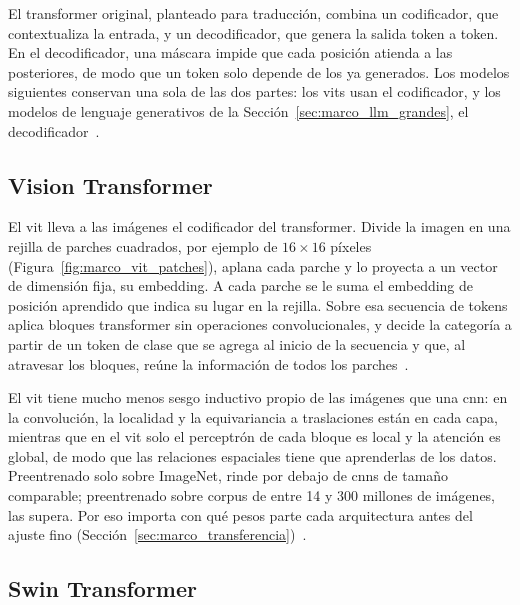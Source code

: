 El transformer original, planteado para traducción, combina un codificador, que contextualiza la entrada, y un
decodificador, que genera la salida token a token. En el decodificador, una máscara impide que cada posición
atienda a las posteriores, de modo que un token solo depende de los ya generados. Los modelos siguientes
conservan una sola de las dos partes: los \glspl{vit} usan el codificador, y los modelos de lenguaje
generativos de la Sección~\ref{sec:marco_llm_grandes}, el
decodificador~\cite{vaswani2017attention,dosovitskiy2021image,brown2020language}.

\subsection{Vision Transformer}
\label{sec:marco_vit}

El \gls{vit} lleva a las imágenes el codificador del transformer. Divide la imagen en una rejilla de parches
cuadrados, por ejemplo de $16 \times 16$ píxeles (Figura~\ref{fig:marco_vit_patches}), aplana cada parche y lo proyecta a un vector de dimensión
fija, su embedding. A cada parche se le suma el embedding de posición aprendido que indica su lugar en la
rejilla. Sobre esa secuencia de tokens aplica bloques transformer sin operaciones convolucionales, y decide la
categoría a partir de un token de clase que se agrega al inicio de la secuencia y que, al atravesar los bloques,
reúne la información de todos los parches~\cite{dosovitskiy2021image}.



El \gls{vit} tiene mucho menos sesgo inductivo propio de las imágenes que una \gls{cnn}: en la convolución, la
localidad y la equivariancia a traslaciones están en cada capa, mientras que en el \gls{vit} solo el
perceptrón de cada bloque es local y la atención es global, de modo que las relaciones espaciales tiene que
aprenderlas de los datos. Preentrenado solo sobre
ImageNet, rinde por debajo de \glspl{cnn} de tamaño comparable; preentrenado sobre
corpus de entre 14 y 300 millones de imágenes, las supera. Por eso importa con qué pesos parte cada
arquitectura antes del ajuste fino (Sección~\ref{sec:marco_transferencia})~\cite{dosovitskiy2021image}.

\subsection{Swin Transformer}
\label{sec:marco_swin}


